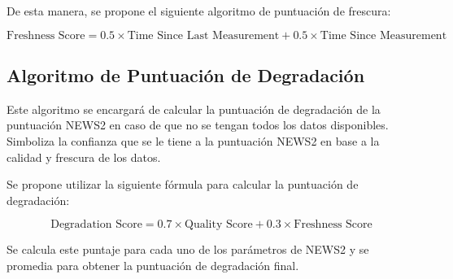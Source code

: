 De esta manera, se propone el siguiente algoritmo de puntuación de frescura:

\begin{equation}
    \text{Freshness Score} = 0.5 \times \text{Time Since Last Measurement} + 0.5 \times \text{Time Since Measurement}
\end{equation}

\subsection{Algoritmo de Puntuación de Degradación}

Este algoritmo se encargará de calcular la puntuación de degradación de la puntuación NEWS2 en caso de que no se tengan todos los datos disponibles.
Simboliza la confianza que se le tiene a la puntuación NEWS2 en base a la calidad y frescura de los datos.

Se propone utilizar la siguiente fórmula para calcular la puntuación de degradación:

\begin{equation}
    \text{Degradation Score} = 0.7 \times \text{Quality Score} + 0.3 \times \text{Freshness Score}
\end{equation}

Se calcula este puntaje para cada uno de los parámetros de NEWS2 y se promedia para obtener la puntuación de degradación final.
